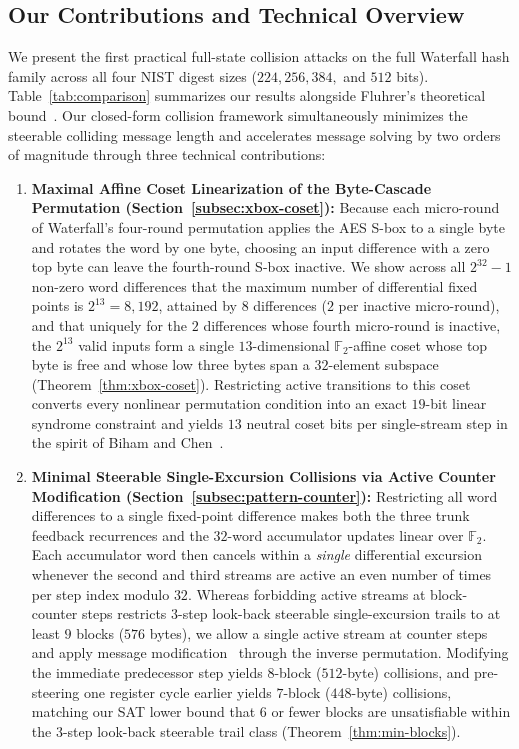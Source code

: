 \documentclass[11pt,a4paper]{article}
\theoremstyle{definition}
\theoremstyle{remark}
\newcommand{\Ftwo}{\mathbb{F}_2}
\begin{document}
\subsection{Our Contributions and Technical Overview}
We present the first practical full-state collision attacks on the full Waterfall hash family across all four NIST digest sizes ($224, 256, 384,$ and $512$ bits). Table~\ref{tab:comparison} summarizes our results alongside Fluhrer's theoretical bound~\cite{Flu08}. Our closed-form collision framework simultaneously minimizes the steerable colliding message length and accelerates message solving by two orders of magnitude through three technical contributions:
\begin{enumerate}[leftmargin=2em]
    \item \textbf{Maximal Affine Coset Linearization of the Byte-Cascade Permutation (Section~\ref{subsec:xbox-coset}):} Because each micro-round of Waterfall's four-round permutation applies the AES S-box to a single byte and rotates the word by one byte, choosing an input difference with a zero top byte can leave the fourth-round S-box inactive. We show across all $2^{32}-1$ non-zero word differences that the maximum number of differential fixed points is $2^{13} = 8{,}192$, attained by $8$ differences ($2$ per inactive micro-round), and that uniquely for the $2$ differences whose fourth micro-round is inactive, the $2^{13}$ valid inputs form a single $13$-dimensional $\Ftwo$-affine coset whose top byte is free and whose low three bytes span a $32$-element subspace (Theorem~\ref{thm:xbox-coset}). Restricting active transitions to this coset converts every nonlinear permutation condition into an exact $19$-bit linear syndrome constraint and yields $13$ neutral coset bits per single-stream step in the spirit of Biham and Chen~\cite{BC04}.
    \item \textbf{Minimal Steerable Single-Excursion Collisions via Active Counter Modification (Section~\ref{subsec:pattern-counter}):} Restricting all word differences to a single fixed-point difference makes both the three trunk feedback recurrences and the $32$-word accumulator updates linear over $\Ftwo$. Each accumulator word then cancels within a \emph{single} differential excursion whenever the second and third streams are active an even number of times per step index modulo $32$. Whereas forbidding active streams at block-counter steps restricts $3$-step look-back steerable single-excursion trails to at least $9$ blocks ($576$ bytes), we allow a single active stream at counter steps and apply message modification~\cite{WangYu05} through the inverse permutation. Modifying the immediate predecessor step yields $8$-block ($512$-byte) collisions, and pre-steering one register cycle earlier yields $7$-block ($448$-byte) collisions, matching our SAT lower bound that $6$ or fewer blocks are unsatisfiable within the $3$-step look-back steerable trail class (Theorem~\ref{thm:min-blocks}).

\end{enumerate}
\end{document}
